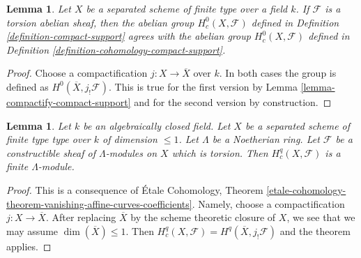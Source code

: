 \documentclass{stacks-project}
\theoremstyle{plain}
\newtheorem{lemma}[subsection]{Lemma}
\theoremstyle{definition}
\theoremstyle{remark}
\numberwithin{equation}{subsection}
\begin{document}
\begin{lemma}
\label{lemma-compact-support-h0}
Let $X$ be a separated scheme of finite type over a field $k$.
If $\mathcal{F}$ is a torsion abelian sheaf, then the abelian group
$H^0_c(X, \mathcal{F})$ defined in Definition \ref{definition-compact-support}
agrees with the abelian group $H^0_c(X, \mathcal{F})$ defined in
Definition \ref{definition-cohomology-compact-support}.
\end{lemma}

\begin{proof}
Choose a compactification $j : X \to \overline{X}$ over $k$.
In both cases the group is defined as $H^0(\overline{X}, j_!\mathcal{F})$.
This is true for the first version by
Lemma \ref{lemma-compactify-compact-support}
and for the second version by construction.
\end{proof}

\begin{lemma}
\label{lemma-finiteness-curves}
Let $k$ be an algebraically closed field. Let $X$ be a separated
scheme of finite type type over $k$ of dimension $\leq 1$.
Let $\Lambda$ be a Noetherian ring.
Let $\mathcal{F}$ be a constructible sheaf of $\Lambda$-modules
on $X$ which is torsion. Then $H^q_c(X, \mathcal{F})$ is a
finite $\Lambda$-module.
\end{lemma}

\begin{proof}
This is a consequence of \'Etale Cohomology, Theorem
\ref{etale-cohomology-theorem-vanishing-affine-curves-coefficients}.
Namely, choose a compactification $j : X \to \overline{X}$.
After replacing $\overline{X}$ by the scheme theoretic closure
of $X$, we see that we may assume $\dim(\overline{X}) \leq 1$.
Then $H^q_c(X, \mathcal{F}) = H^q(\overline{X}, j_!\mathcal{F})$
and the theorem applies.
\end{proof}
\end{document}
